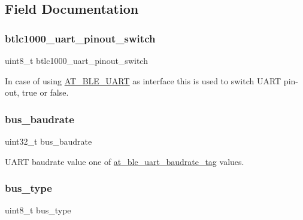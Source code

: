 \subsection{Field Documentation}
\mbox{\label{structat__ble__bus__info__t_adcb4737ceda8181e0320a9decbb72f7f}} 
\subsubsection{\texorpdfstring{btlc1000\_uart\_pinout\_switch}{btlc1000\_uart\_pinout\_switch}}
{\footnotesize\ttfamily uint8\+\_\+t btlc1000\+\_\+uart\+\_\+pinout\+\_\+switch}



In case of using \mbox{\hyperlink{at__ble__api_8h_a42bc6bd8b2502ca57a35ba77d29bad8ca8fe67bfab4b12ad57597bb27c46ebe1f}{A\+T\+\_\+\+B\+L\+E\+\_\+\+U\+A\+RT}} as interface this is used to switch U\+A\+RT pin-\/out, true or false. 

\mbox{\label{structat__ble__bus__info__t_a9fd6a700bdcd24eac39b919db84beeaa}} 
\subsubsection{\texorpdfstring{bus\_baudrate}{bus\_baudrate}}
{\footnotesize\ttfamily uint32\+\_\+t bus\+\_\+baudrate}



U\+A\+RT baudrate value one of \mbox{\hyperlink{at__ble__api_8h_af9f45be471328ddc873fa3b6d3fe865a}{at\+\_\+ble\+\_\+uart\+\_\+baudrate\+\_\+tag}} values. 

\mbox{\label{structat__ble__bus__info__t_acd9e3a84de3da90418d97b78eb84d2bd}} 
\subsubsection{\texorpdfstring{bus\_type}{bus\_type}}
{\footnotesize\ttfamily uint8\+\_\+t bus\+\_\+type}



